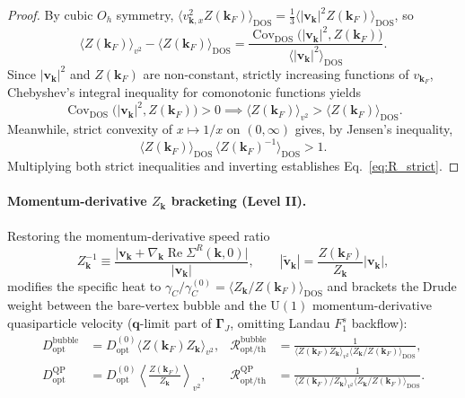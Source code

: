 \documentclass[11pt,a4paper]{article}
\numberwithin{equation}{section}
\theoremstyle{plain}
\theoremstyle{definition}
\providecommand{\vk}{\mathbf{k}}
\providecommand{\vq}{\mathbf{q}}
\providecommand{\vv}{\mathbf{v}}
\providecommand{\re}{\operatorname{Re}}
\begin{document}
\begin{proof}
By cubic $O_h$ symmetry, $\langle v_{\vk,x}^2 Z(\vk_F)\rangle_{\mathrm{DOS}} = \frac{1}{3}\langle |\vv_{\vk}|^2 Z(\vk_F)\rangle_{\mathrm{DOS}}$,
so
\begin{equation}
    \langle Z(\vk_F)\rangle_{v^2} - \langle Z(\vk_F)\rangle_{\mathrm{DOS}}
    = \frac{\operatorname{Cov}_{\mathrm{DOS}}\bigl(|\vv_{\vk}|^2, Z(\vk_F)\bigr)}
           {\langle |\vv_{\vk}|^2\rangle_{\mathrm{DOS}}}.
\end{equation}
Since $|\vv_{\vk}|^2$ and $Z(\vk_F)$ are non-constant, strictly increasing functions of
$v_{\vk_F}$, Chebyshev's integral inequality for comonotonic functions yields
\begin{equation}
    \operatorname{Cov}_{\mathrm{DOS}}\bigl(|\vv_{\vk}|^2, Z(\vk_F)\bigr) > 0
    \implies
    \langle Z(\vk_F)\rangle_{v^2} > \langle Z(\vk_F)\rangle_{\mathrm{DOS}}.
\end{equation}
Meanwhile, strict convexity of $x \mapsto 1/x$ on $(0,\infty)$ gives, by Jensen's
inequality,
\begin{equation}
    \langle Z(\vk_F)\rangle_{\mathrm{DOS}}\, \langle Z(\vk_F)^{-1}\rangle_{\mathrm{DOS}} > 1.
\end{equation}
Multiplying both strict inequalities and inverting establishes Eq.~\eqref{eq:R_strict}.
\end{proof}

\paragraph{Momentum-derivative $Z_{\vk}$ bracketing (Level II).}
Restoring the momentum-derivative speed ratio
\begin{equation}
    Z_{\vk}^{-1} \equiv \frac{\bigl|\vv_{\vk} + \nabla_{\vk}\re\Sigma^R(\vk,0)\bigr|}{|\vv_{\vk}|},
    \qquad
    |\tilde{\vv}_{\vk}| = \frac{Z(\vk_F)}{Z_{\vk}}|\vv_{\vk}|,
    \label{eq:Z_k_deriv}
\end{equation}
modifies the specific heat to $\gamma_C/\gamma_C^{(0)} = \langle Z_{\vk}/Z(\vk_F)\rangle_{\mathrm{DOS}}$
and brackets the Drude weight between the bare-vertex bubble and the $\mathrm{U}(1)$
momentum-derivative quasiparticle velocity ($\vq$-limit part of $\mathbf{\Gamma}_J$,
omitting Landau $F_1^s$ backflow):
\begin{align}
    D_{\mathrm{opt}}^{\mathrm{bubble}} &= D_{\mathrm{opt}}^{(0)}\langle Z(\vk_F)Z_{\vk}\rangle_{v^2},
    &
    \mathcal{R}_{\mathrm{opt/th}}^{\mathrm{bubble}}
    &= \frac{1}{\langle Z(\vk_F)Z_{\vk}\rangle_{v^2}\langle Z_{\vk}/Z(\vk_F)\rangle_{\mathrm{DOS}}},
    \label{eq:R_bubble} \\
    D_{\mathrm{opt}}^{\mathrm{QP}} &= D_{\mathrm{opt}}^{(0)}\left\langle \frac{Z(\vk_F)}{Z_{\vk}}\right\rangle_{\!v^2},
    &
    \mathcal{R}_{\mathrm{opt/th}}^{\mathrm{QP}}
    &= \frac{1}{\langle Z(\vk_F)/Z_{\vk}\rangle_{v^2}\langle Z_{\vk}/Z(\vk_F)\rangle_{\mathrm{DOS}}}.
    \label{eq:R_QP}
\end{align}
\end{document}
